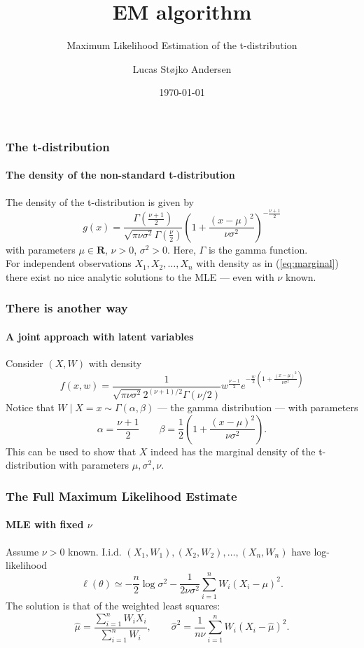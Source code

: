 \documentclass[aspectratio=169]{beamer}
\title{EM algorithm}
\subtitle{Maximum Likelihood Estimation of the t-distribution}
\author{Lucas Støjko Andersen}
\institute{University of Copenhagen}
\date{\today}
\begin{document}
\begin{frame}
    \titlepage
\end{frame}
\begin{frame}
    \frametitle{The t-distribution}
    \framesubtitle{The density of the non-standard t-distribution}
    The density of the t-distribution is given by
    \begin{equation}
        \label{eq:marginal}
        g(x)=\frac{\Gamma\left(\frac{\nu + 1}{2}\right)}{\sqrt{\pi\nu\sigma^2}\Gamma\left(\frac{\nu}{2}\right)}\left(1+\frac{(x - \mu)^2}{\nu\sigma^2}\right)^{-\frac{\nu + 1}{2}}
    \end{equation}
    with parameters $\mu\in\mathbf{R}$, $\nu > 0$, $\sigma^2 > 0$. Here, $\Gamma$ is the gamma function.\\[12pt]
    For independent observations $X_{1},X_{2},\ldots,X_{n}$ with density as in (\ref{eq:marginal}) there exist no nice analytic solutions to the MLE --- even with $\nu$ known.
\end{frame}
\begin{frame}
    \frametitle{There is another way}
    \framesubtitle{A joint approach with latent variables}
    Consider $(X, W)$ with density
    \begin{equation}
        \label{eq:join}
        f(x,w)=\frac{1}{\sqrt{\pi\nu\sigma^2}2^{(\nu+1)/2}\Gamma(\nu/2)}w^{\frac{\nu - 1}{2}}e^{-\frac{w}{2}\left(1+\frac{(x -\mu)^2}{\nu\sigma^2}\right)}
    \end{equation}
    Notice that $W\mid X = x \sim \Gamma(\alpha, \beta)$ --- the gamma distribution --- with parameters
    \begin{equation}
        \alpha = \frac{\nu + 1}{2} \quad\quad 
        \beta = \frac{1}{2}\left(1+\frac{(x -\mu)^2}{\nu\sigma^2}\right).
    \end{equation}
    This can be used to show that $X$ indeed has the marginal density of the t-distribution with parameters $\mu,\sigma^2,\nu$.
\end{frame}
\begin{frame}
    \frametitle{The Full Maximum Likelihood Estimate}
    \framesubtitle{MLE with fixed $\nu$}
    Assume $\nu>0$ known. I.i.d. $(X_{1},W_{1}), (X_{2},W_{2}),\ldots,(X_{n},W_{n})$ have log-likelihood
    \begin{equation}
        \ell(\theta)\simeq -\frac{n}{2}\log\sigma^2 -\frac{1}{2\nu\sigma^2}\sum_{i=1}^{n}W_{i}(X_{i}-\mu)^{2}.
    \end{equation}
    The solution is that of the weighted least squares:
    \begin{equation}
        \hat\mu =\frac{\sum_{i=1}^{n}W_{i}X_{i}}{\sum_{i=1}^{n}W_{i}},\quad\quad \hat\sigma^2 = \frac{1}{n\nu}\sum_{i=1}^{n}W_{i}(X_{i}-\hat\mu)^{2}.
    \end{equation}
\end{frame}
\end{document}
